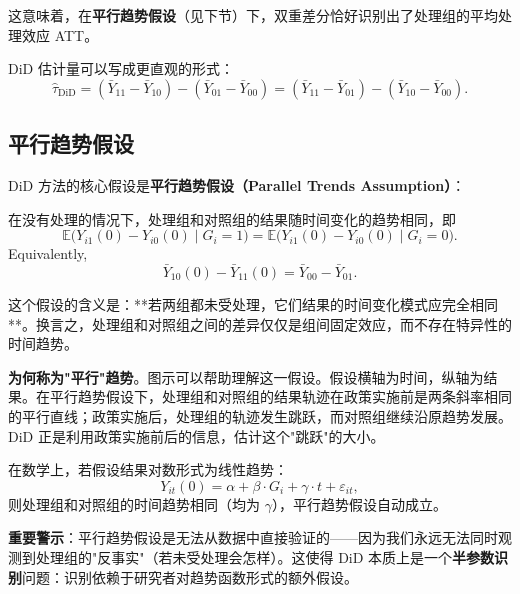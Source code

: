 这意味着，在\textbf{平行趋势假设}（见下节）下，双重差分恰好识别出了处理组的平均处理效应 ATT。

DiD 估计量可以写成更直观的形式：
\[
\hat{\tau}_\text{DiD} = (\bar{Y}_{11} - \bar{Y}_{10}) - (\bar{Y}_{01} - \bar{Y}_{00})
= (\bar{Y}_{11} - \bar{Y}_{01}) - (\bar{Y}_{10} - \bar{Y}_{00}).
\label{eq:appendix-did-estimator}
\]

\fboxsep=6pt\fboxrule=1pt
\noindent{}

\subsection{平行趋势假设}\label{sec:appendix-did-pt}

DiD 方法的核心假设是\textbf{平行趋势假设（Parallel Trends Assumption）}：

\begin{Assumption}[平行趋势假设]\label{assum:appendix-did-pt}
在没有处理的情况下，处理组和对照组的结果随时间变化的趋势相同，即
\[
\mathbb{E}\bigl( Y_{i1}(0) - Y_{i0}(0) \mid G_i = 1 \bigr) = \mathbb{E}\bigl( Y_{i1}(0) - Y_{i0}(0) \mid G_i = 0 \bigr).
\]
Equivalently,
\[
\bar{Y}_{10}(0) - \bar{Y}_{11}(0) = \bar{Y}_{00} - \bar{Y}_{01}.
\]
\end{Assumption}

这个假设的含义是：**若两组都未受处理，它们结果的时间变化模式应完全相同**。换言之，处理组和对照组之间的差异仅仅是组间固定效应，而不存在特异性的时间趋势。

\textbf{为何称为"平行"趋势}。图示可以帮助理解这一假设。假设横轴为时间，纵轴为结果。在平行趋势假设下，处理组和对照组的结果轨迹在政策实施前是两条斜率相同的平行直线；政策实施后，处理组的轨迹发生跳跃，而对照组继续沿原趋势发展。DiD 正是利用政策实施前后的信息，估计这个"跳跃"的大小。

在数学上，若假设结果对数形式为线性趋势：
\[
Y_{it}(0) = \alpha + \beta \cdot G_i + \gamma \cdot t + \varepsilon_{it},
\]
则处理组和对照组的时间趋势相同（均为 $\gamma$），平行趋势假设自动成立。

\textbf{重要警示}：平行趋势假设是无法从数据中直接验证的——因为我们永远无法同时观测到处理组的"反事实"（若未受处理会怎样）。这使得 DiD 本质上是一个\textbf{半参数识别}问题：识别依赖于研究者对趋势函数形式的额外假设。

